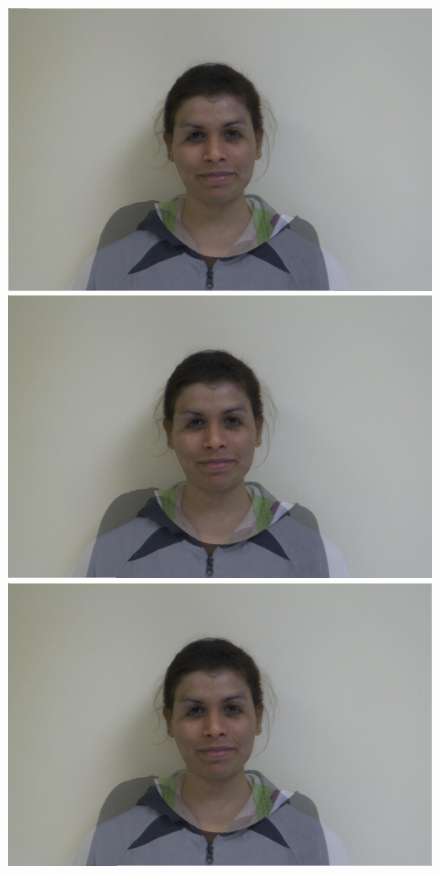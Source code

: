 \documentclass[11pt]{article}
\begin{document}
\begin{figure}[H]
\begin{center}
\includegraphics[scale=0.06]{figs/frames/morph_steinkirch_tangatur_28.jpg} 
\includegraphics[scale=0.06]{figs/frames/morph_steinkirch_tangatur_29.jpg}  
\includegraphics[scale=0.06]{figs/frames/morph_steinkirch_tangatur_30.jpg} 

\end{center}
\end{figure}
\end{document}

